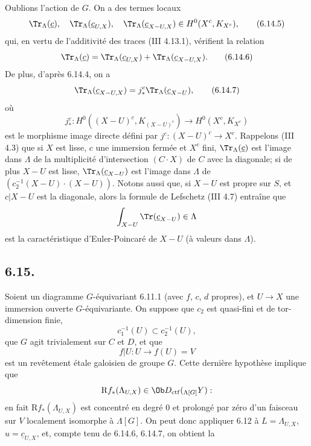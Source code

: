 Oublions l'action de $G$. On a des termes locaux
\begin{equation}
\Tr_{\Lambda}(\underline c),\quad
\Tr_{\Lambda}(\underline c_{U,X}),\quad
\Tr_{\Lambda}(\underline c_{X-U,X})
\in H^0(X^c,K_{X^c}),
\tag{6.14.5}
\end{equation}
qui, en vertu de l'additivité des traces (III 4.13.1), vérifient la relation
\begin{equation}
\Tr_{\Lambda}(\underline c)
=
\Tr_{\Lambda}(\underline c_{U,X})
+
\Tr_{\Lambda}(\underline c_{X-U,X}).
\tag{6.14.6}
\end{equation}
De plus, d'après 6.14.4, on a
\begin{equation}
\Tr_{\Lambda}(\underline c_{X-U,X})
=
j_*^c\Tr_{\Lambda}(\underline c_{X-U}),
\tag{6.14.7}
\end{equation}
où
\[
j_*^c:H^0((X-U)^c,K_{(X-U)^c})\longrightarrow H^0(X^c,K_{X^c})
\]
est le morphisme image directe défini par $j^c:(X-U)^c\to X^c$. Rappelons (III 4.3) que si $X$ est lisse, $c$ une immersion fermée et $X^c$ fini, $\Tr_{\Lambda}(\underline c)$ est l'image dans $\Lambda$ de la multiplicité d'intersection $(C\cdot X)$ de $C$ avec la diagonale; si de plus $X-U$ est lisse, $\Tr_{\Lambda}(\underline c_{X-U})$ est l'image dans $\Lambda$ de $(c_2^{-1}(X-U)\cdot(X-U))$. Notons aussi que, si $X-U$ est propre sur $S$, et $c|X-U$ est la diagonale, alors la formule de
Lefschetz 
(III 4.7) entraîne que
\[
\int_{X-U}\Tr(\underline c_{X-U})\in\Lambda
\]
est la caractéristique d'Euler-Poincaré de $X-U$ (à valeurs dans $\Lambda$).

\subsection*{6.15.}
Soient un diagramme $G$-équivariant 6.11.1 (avec $f$, $c$, $d$ propres), et $U\to X$ une immersion ouverte $G$-équivariante. On suppose que $c_2$ est quasi-fini et de tor-dimension finie,
\[
c_1^{-1}(U)\subset c_2^{-1}(U),
\]
que $G$ agit trivialement sur $C$ et $D$, et que
\[
f|U:U\longrightarrow f(U)=V
\]
est un revêtement étale galoisien de groupe $G$. Cette dernière hypothèse implique que
\[
\mathrm{R} f_*(\Lambda_{U,X})\in\Ob D_{\mathrm{ctf}}({}_{\Lambda[G]}Y):
\]
en fait $\mathrm{R} f_*(\Lambda_{U,X})$ est concentré en degré $0$ et prolongé par zéro d'un faisceau sur $V$ localement isomorphe à $\Lambda[G]$. On peut donc appliquer 6.12 à $L=\Lambda_{U,X}$, $u=\underline c_{U,X}$, et, compte tenu de 6.14.6, 6.14.7, on obtient la

